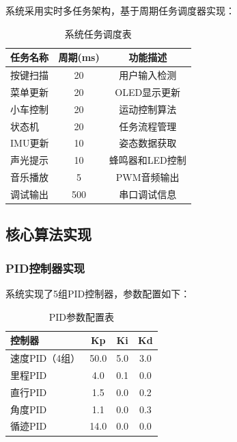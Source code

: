 \documentclass[UTF8]{ctexart}
\begin{document}
系统采用实时多任务架构，基于周期任务调度器实现：

\begin{table}[H]
    \centering
    \caption{系统任务调度表}
    \label{tab:task_schedule}
    \begin{tabular}{lcc}
        \toprule
        任务名称 & 周期(ms) & 功能描述 \\
        \midrule
        按键扫描 & 20 & 用户输入检测 \\
        菜单更新 & 20 & OLED显示更新 \\
        小车控制 & 20 & 运动控制算法 \\
        状态机 & 20 & 任务流程管理 \\
        IMU更新 & 10 & 姿态数据获取 \\
        声光提示 & 10 & 蜂鸣器和LED控制 \\
        音乐播放 & 5 & PWM音频输出 \\
        调试输出 & 500 & 串口调试信息 \\
        \bottomrule
    \end{tabular}
\end{table}

\subsection{核心算法实现}

\subsubsection{PID控制器实现}

系统实现了5组PID控制器，参数配置如下：

\begin{table}[H]
    \centering
    \caption{PID参数配置表}
    \label{tab:pid_params}
    \begin{tabular}{lccc}
        \toprule
        控制器 & Kp & Ki & Kd \\
        \midrule
        速度PID（4组） & 50.0 & 5.0 & 3.0 \\
        里程PID & 4.0 & 0.1 & 0.0 \\
        直行PID & 1.5 & 0.0 & 0.2 \\
        角度PID & 1.1 & 0.0 & 0.3 \\
        循迹PID & 14.0 & 0.0 & 0.0 \\
        \bottomrule
    \end{tabular}
\end{table}
\end{document}
